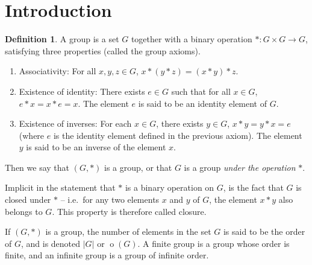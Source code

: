\documentclass[svgnames]{article}
\theoremstyle{definition}
\newtheorem{Definition}[Definition]{Definition}
\theoremstyle{remark}
\DeclareMathOperator{\ord}{o}
\newcommand{\newterm}[1]{{\color{alertcolor} #1}}
\begin{document}
\printnomenclature[10em]

\clearpage

\section{Introduction}\label{sec:Intro}

\begin{Definition}\label{def:Group}
A \newterm{group} is a set $G$ together with a binary operation $* \colon G \times G \to G$, satisfying three properties (called the \newterm{group axioms}).
\begin{enumerate}[label = (\roman*)]
\item\label{it:Axiom1} Associativity: For all $x, y, z \in G$, $x * (y * z) = (x * y) * z$.
\item\label{it:Axiom2} Existence of identity: There exists $e \in G$ such that for all $x \in G$, $e * x = x * e = x$. The element $e$ is said to be an \newterm{identity element} of $G$.
\item\label{it:Axiom3} Existence of inverses: For each $x \in G$, there exists $y \in G$, $x * y = y * x = e$ (where $e$ is the identity element defined in the previous axiom). The element $y$ is said to be an \newterm{inverse} of the element $x$.
\end{enumerate}
Then we say that $(G, *)$ is a group, or that $G$ is a group \emph{under the operation} $*$.
\end{Definition}

Implicit in the statement that $*$ is a binary operation on $G$, is the fact that $G$ is \newterm{closed} under $*$ -- i.e.\ for any two elements $x$ and $y$ of $G$, the element $x * y$ also belongs to $G$. This property is therefore called \newterm{closure}.

\label{def:OrdGrp} If $(G, *)$ is a group, the number of elements in the set $G$ is said to be the \newterm{order} of $G$, and is denoted $|G|$ or $\ord(G)$. A \newterm{finite group} is a group whose order is finite, and an \newterm{infinite group} is a group of infinite order.
\end{document}

